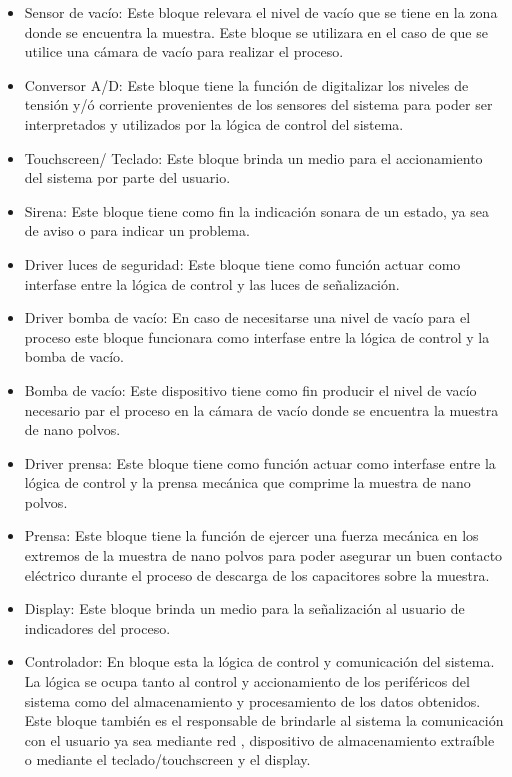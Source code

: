 \documentclass[12pt]{article}
\begin{document}
\begin{itemize}
    \item Sensor de vacío: Este bloque relevara el nivel de vacío que se tiene en la zona donde se encuentra la muestra. Este bloque se utilizara en el caso de 
			    que se utilice una cámara de vacío para realizar el proceso.

    \item Conversor A/D: Este bloque tiene la función de digitalizar los niveles de tensión y/ó corriente provenientes de los sensores del sistema para poder
			  ser interpretados y utilizados por la lógica de control del sistema.

    \item Touchscreen/ Teclado: Este bloque brinda un medio para el accionamiento del sistema por parte del usuario.

    \item Sirena: Este bloque tiene como fin la indicación sonara de un estado, ya sea de aviso o para indicar un problema.

    \item Driver luces de seguridad: Este bloque tiene como función actuar como interfase entre la lógica de control y las luces de señalización.

    \item Driver bomba de vacío: En caso de necesitarse una nivel de vacío para el proceso este bloque funcionara como interfase entre la lógica de control
				  y la bomba de vacío.

    \item Bomba de vacío: Este dispositivo tiene como fin producir el nivel de vacío necesario par el proceso en la cámara de vacío donde se encuentra la muestra de
			  nano polvos.

    \item Driver prensa:  Este bloque tiene como función actuar como interfase entre la lógica de control y la prensa mecánica que comprime la muestra de nano polvos.

    \item Prensa: Este bloque tiene la función de ejercer una fuerza mecánica en los extremos de la muestra de nano polvos para poder asegurar un buen contacto
		  eléctrico durante el proceso de descarga de los capacitores sobre la muestra.

    \item Display: Este bloque brinda un medio para la señalización al usuario de indicadores del proceso.

    \item Controlador: En bloque esta la lógica de control y comunicación del sistema. La lógica se ocupa tanto al control y accionamiento de los periféricos
		      del sistema como del almacenamiento y procesamiento de los datos obtenidos. Este bloque también es el responsable de brindarle al sistema
		      la comunicación con el usuario ya sea mediante red , dispositivo de almacenamiento extraíble o mediante el teclado/touchscreen y el display.

  \end{itemize}
\end{document}
